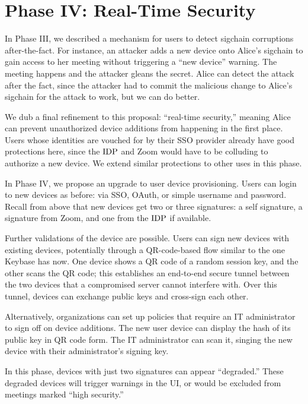 \section{Phase IV: Real-Time Security}

In Phase III, we described a mechanism for users to detect sigchain corruptions after-the-fact. For instance, an attacker adds a new device onto Alice's sigchain to gain access to her meeting without triggering a ``new device'' warning. The meeting happens and the attacker gleans the secret. Alice can detect the attack after the fact, since the attacker had to commit the malicious change to Alice's sigchain for the attack to work, but we can do better.

We dub a final refinement to this proposal: ``real-time security,'' meaning Alice can prevent unauthorized device additions from happening in the first place. Users whose identities are vouched for by their SSO provider already have good protections here, since the $\mathrm{IDP}$ and Zoom would have to be colluding to authorize a new device. We extend similar protections to other uses in this phase.

In Phase IV, we propose an upgrade to user device provisioning. Users can login to new devices as before: via SSO, OAuth, or simple username and password. Recall from above that new devices get two or three signatures: a self signature, a signature from Zoom, and one from the $\mathrm{IDP}$ if available.

Further validations of the device are possible. Users can sign new devices with existing devices, potentially through a QR-code-based flow similar to the one Keybase has now. One device shows a QR code of a random session key, and the other scans the QR code; this establishes an end-to-end secure tunnel between the two devices that a compromised server cannot interfere with. Over this tunnel, devices can exchange public keys and cross-sign each other.

Alternatively, organizations can set up policies that require an IT administrator to sign off on device additions. The new user device can display the hash of its public key in QR code form. The IT administrator can scan it, singing the new device with their administrator's signing key.

In this phase, devices with just two signatures can appear ``degraded.'' These degraded devices will trigger warnings in the UI, or would be excluded from meetings marked ``high security.''